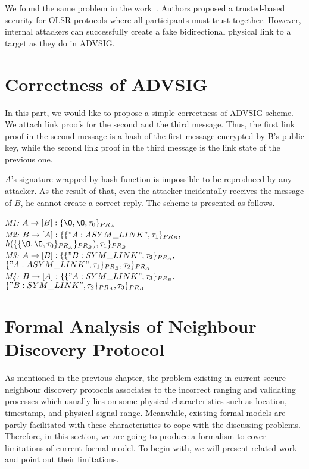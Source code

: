 We found the same problem in the work~\cite{Adnane20131159}. Authors proposed a trusted-based security for OLSR protocols where all participants must trust together. However, internal attackers can successfully create a fake bidirectional physical link to a target as they do in ADVSIG. 

\section{Correctness of ADVSIG}
In this part, we would like to propose a simple correctness of ADVSIG scheme. We attach link proofs for the second and the third message. Thus, the first link proof in the second message is a hash of the first message encrypted by B's public key, while the second link proof in the third message is the link state of the previous one. 

$A$'s signature wrapped by hash function is impossible to be reproduced by any attacker. As the result of that, even the attacker incidentally receives the message of $B$, he cannot create a correct reply. The scheme is presented as follows. 

\begin{flushleft}
 \emph{M1:} $A \to [B]: \{\O, \O, \tau_0\}_{PR_A}$\\
 \emph{M2:} $B \to [A]: \{\{"A:ASYM\_LINK", \tau_1\}_{PR_B},$ $h(\{\{\O, \O, \tau_0\}_{PR_A}\}_{PR_B}),\tau_1\}_{PR_B}$\\
\emph{M3:} $A \to [B]: \{\{ "B:SYM\_LINK",\tau_2\}_{PR_A},$ $\{"A:ASYM\_LINK", \tau_1\}_{PR_B},\tau_2\}_{PR_A}$\\
 \emph{M4:} $B \to [A] : \{\{ "A:SYM\_LINK", \tau_3\}_{PR_B},$ $\{"B:SYM\_LINK",\tau_2\}_{PR_A} ,\tau_3\}_{PR_B}$
\end{flushleft}

\section{Formal Analysis of Neighbour Discovery Protocol}

As mentioned in the previous chapter, the problem existing in current secure neighbour discovery protocols associates to the incorrect ranging and validating processes which usually lies on some physical characteristics such as location, timestamp, and physical signal range. Meanwhile, existing formal models are partly facilitated with these characteristics to cope with the discussing problems. Therefore, in this section, we are going to produce a formalism to cover limitations of current formal model. To begin with, we will present related work and point out their limitations. 

